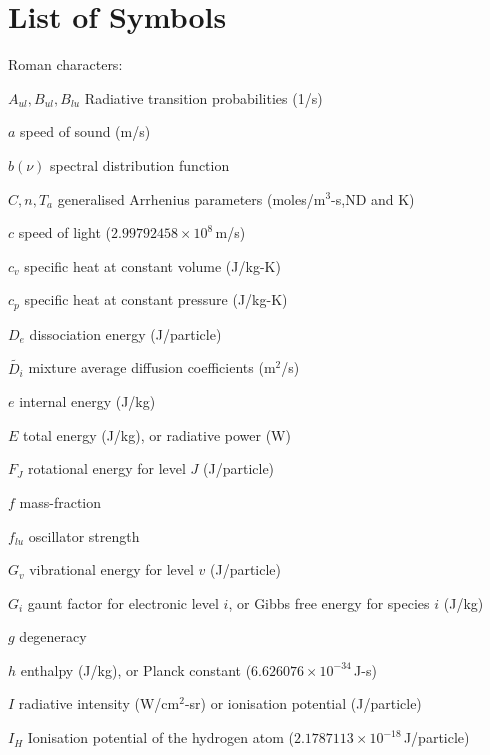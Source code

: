 \chapter{List of Symbols}


Roman characters: 

\par

\begin{list}{}{%
\setlength{\labelwidth}{35mm}
\setlength{\leftmargin}{45mm}}
 \item[$A_{ul},B_{ul},B_{lu}$\dotfill] Radiative transition probabilities (1/s)
 \item[$a$\dotfill] speed of sound (m/s)
 \item[$b(\nu)$\dotfill] spectral distribution function
 \item[$C,n,T_a$\dotfill] generalised Arrhenius parameters (moles/m$^3$-s,ND and K)
 \item[$c$\dotfill] speed of light ($2.99792458 \times 10^8$\,m/s)
 \item[$c_v$\dotfill] specific heat at constant volume (J/kg-K)
 \item[$c_p$\dotfill] specific heat at constant pressure (J/kg-K)
 \item[$D_e$\dotfill] dissociation energy (J/particle)
 \item[$\tilde{D_{i}}$\dotfill] mixture average diffusion coefficients (m$^2$/s)
 \item[$e$\dotfill] internal energy (J/kg)
 \item[$E$\dotfill] total energy (J/kg), or radiative power (W)
  \item[$F_J$\dotfill] rotational energy for level $J$ (J/particle)
 \item[$f$\dotfill] mass-fraction
 \item[$f_{lu}$\dotfill] oscillator strength
 \item[$G_v$\dotfill] vibrational energy for level $v$ (J/particle)
 \item[$G_i$\dotfill] gaunt factor for electronic level $i$, or Gibbs free energy for species $i$ (J/kg)
 \item[$g$\dotfill] degeneracy
  \item[$h$\dotfill] enthalpy (J/kg), or Planck constant ($6.626076 \times 10^{-34}$\,J-s)
  \item[$I$\dotfill] radiative intensity (W/cm$^2$-sr) or ionisation potential (J/particle)
 \item[$I_H$\dotfill] Ionisation potential of the hydrogen atom ($2.1787113 \times 10^{-18}$\,J/particle)

\end{list}
